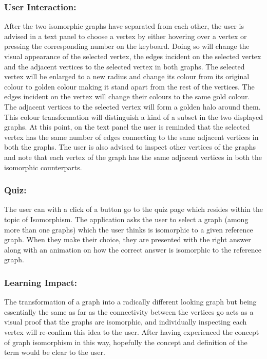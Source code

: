 \subsubsection{User Interaction:}
After the two isomorphic graphs have separated from each other, the user is
advised in a text panel to choose a vertex by either hovering over a vertex or
pressing the corresponding number on the keyboard. Doing so will change the
visual appearance of the selected vertex, the edges incident on the selected
vertex and the adjacent vertices to the selected vertex in both graphs.  The
selected vertex will be enlarged to a new radius and change its colour from its
original colour to golden colour making it stand apart from the rest of the
vertices.  The edges incident on the vertex will change their colours to the
same gold colour.  The adjacent vertices to the selected vertex will form a
golden halo around them.  This colour transformation will distinguish a kind of
a subset in the two displayed graphs. At this point, on the text panel
the user is reminded that the selected vertex has the same number of edges
connecting to the same adjacent vertices in both the graphs. The user is also
advised to inspect other vertices of the graphs and note that each
vertex of the graph has the same adjacent vertices in both the isomorphic
counterparts.

\subsubsection{Quiz:}
The user can with a click of a button go to the quiz page which resides within
the topic of Isomorphism. The application asks the user to select a graph (among more than
one graphs) which the user thinks is isomorphic to a given reference graph.  When
they make their choice, they are presented with the right answer along with an animation on
how the correct answer is isomorphic to the reference graph.

\subsubsection{Learning Impact:}
The transformation of a graph into a radically different looking graph but
being essentially the same as far as the connectivity between the vertices go
acts as a visual proof that the graphs are isomorphic, and individually
inspecting each vertex will re-confirm this idea to the user. After having
experienced the concept of graph isomorphism in this way, hopefully the
concept and definition of the term would be clear to the user.


